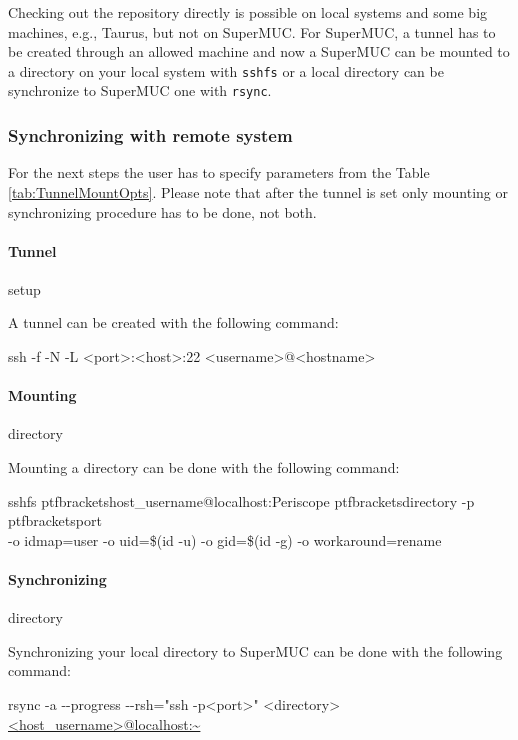 \documentclass[11pt,a4paper, oneside]{book} %
\newcommand{\ptfbrackets}[1]{\textless #1\textgreater}
\begin{document}
Checking out the repository directly is possible on local systems and some big
machines, e.g., Taurus, but not on SuperMUC. For SuperMUC, a tunnel has to be
created through an allowed machine and now a SuperMUC can be mounted to a
directory on your local system with \texttt{sshfs} or a local directory can be
synchronize to SuperMUC one with \texttt{rsync}.

\subsubsection{Synchronizing with remote system}

For the next steps the user has to specify parameters from the Table
\ref{tab:TunnelMountOpts}. Please note that after the tunnel is set only
mounting or synchronizing procedure has to be done, not both.

\paragraph{Tunnel} setup

A tunnel can be created with the following command:

ssh -f -N -L \ptfbrackets{port}:\ptfbrackets{host}:22
\ptfbrackets{username}@\ptfbrackets{hostname}

\paragraph{Mounting} directory

Mounting a directory can be done with the following command:

sshfs ptfbrackets{host\_username}@localhost:Periscope
ptfbrackets{directory} -p ptfbrackets{port}\\
-o idmap=user -o uid=\$(id -u) -o gid=\$(id -g) -o workaround=rename

\paragraph{Synchronizing} directory

Synchronizing your local directory to SuperMUC can be done with the following
command:

rsync -a -{}-progress -{}-rsh="ssh -p\ptfbrackets{port}" \ptfbrackets{directory}\\
\url{<host\_username>@localhost:~}
\end{document}
